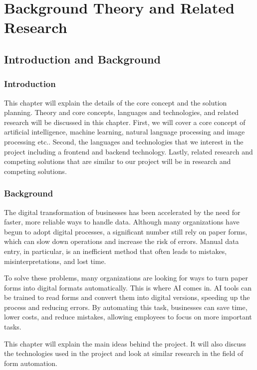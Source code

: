 \documentclass[12pt,oneside,openright,a4paper]{cpe-english-project}
\begin{document}
\chapter{Background Theory and Related Research}

\section{Introduction and Background}
\subsection{Introduction}
This chapter will explain the details of the core concept and the solution planning. Theory and core concepts, languages and technologies, and related research will be discussed in this chapter. First, we will cover a core concept of artificial intelligence, machine learning, natural language processing and image processing etc.. Second, the languages and technologies that we interest in the project including a frontend and backend technology. Lastly, related research and competing solutions that are similar to our project will be in research and competing solutions.

\subsection{Background}
The digital transformation of businesses has been accelerated by the need for faster, more reliable ways to handle data. Although many organizations have begun to adopt digital processes, a significant number still rely on paper forms, which can slow down operations and increase the risk of errors. Manual data entry, in particular, is an inefficient method that often leads to mistakes, misinterpretations, and lost time. \par
To solve these problems, many organizations are looking for ways to turn paper forms into digital formats automatically. This is where AI comes in. AI tools can be trained to read forms and convert them into digital versions, speeding up the process and reducing errors. By automating this task, businesses can save time, lower costs, and reduce mistakes, allowing employees to focus on more important tasks.\par
This chapter will explain the main ideas behind the project. It will also discuss the technologies used in the project and look at similar research in the field of form automation.
\end{document}
